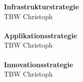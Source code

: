 \textbf{Infrastrukturstrategie}\\
TBW Christoph\\\\

\textbf{Applikationsstrategie}\\
TBW Christoph\\\\

\textbf{Innovationsstrategie}\\
TBW Christoph\\\\